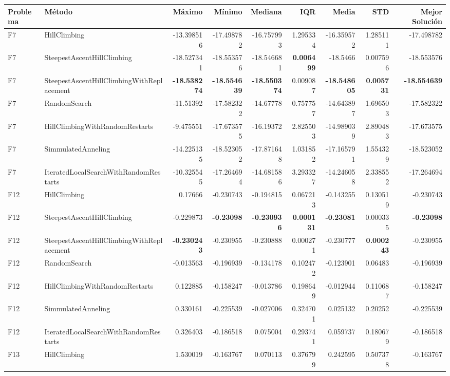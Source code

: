 \begin{tabular}{llrrrrrrr}
\toprule
Problema & Método & Máximo & Mínimo & Mediana & IQR & Media & STD & Mejor Solución \\ 
\midrule
F7 & HillClimbing & -13.398516 & -17.498782 & -16.757993 & 1.295334 & -16.359572 & 1.285111 & -17.498782 \\ 
F7 & SteepestAscentHillClimbing & -18.527341 & -18.553576 & -18.546681 & \textbf{0.006499} & -18.5466 & 0.007596 & -18.553576 \\ 
F7 & SteepestAscentHillClimbingWithReplacement & \textbf{-18.538274} & \textbf{-18.554639} & \textbf{-18.550374} & 0.009087 & \textbf{-18.548605} & \textbf{0.005731} & \textbf{-18.554639} \\ 
F7 & RandomSearch & -11.51392 & -17.582322 & -14.67778 & 0.757757 & -14.643897 & 1.696503 & -17.582322 \\ 
F7 & HillClimbingWithRandomRestarts & -9.475551 & -17.673575 & -16.19372 & 2.825503 & -14.989039 & 2.890483 & -17.673575 \\ 
F7 & SimmulatedAnneling & -14.225135 & -18.523052 & -17.871648 & 1.031852 & -17.165791 & 1.554329 & -18.523052 \\ 
F7 & IteratedLocalSearchWithRandomRestarts & -10.325545 & -17.264694 & -14.681586 & 3.293327 & -14.246058 & 2.338552 & -17.264694 \\ 
F12 & HillClimbing & 0.17666 & -0.230743 & -0.194815 & 0.067213 & -0.143255 & 0.130519 & -0.230743 \\ 
F12 & SteepestAscentHillClimbing & -0.229873 & \textbf{-0.23098} & \textbf{-0.230936} & \textbf{0.000131} & \textbf{-0.23081} & 0.000335 & \textbf{-0.23098} \\ 
F12 & SteepestAscentHillClimbingWithReplacement & \textbf{-0.230243} & -0.230955 & -0.230888 & 0.000271 & -0.230777 & \textbf{0.000243} & -0.230955 \\ 
F12 & RandomSearch & -0.013563 & -0.196939 & -0.134178 & 0.102472 & -0.123901 & 0.06483 & -0.196939 \\ 
F12 & HillClimbingWithRandomRestarts & 0.122885 & -0.158247 & -0.013786 & 0.198649 & -0.012944 & 0.110687 & -0.158247 \\ 
F12 & SimmulatedAnneling & 0.330161 & -0.225539 & -0.027006 & 0.324701 & 0.025132 & 0.20252 & -0.225539 \\ 
F12 & IteratedLocalSearchWithRandomRestarts & 0.326403 & -0.186518 & 0.075004 & 0.293741 & 0.059737 & 0.180679 & -0.186518 \\ 
F13 & HillClimbing & 1.530019 & -0.163767 & 0.070113 & 0.376799 & 0.242595 & 0.507378 & -0.163767 \\ 

\end{tabular}
